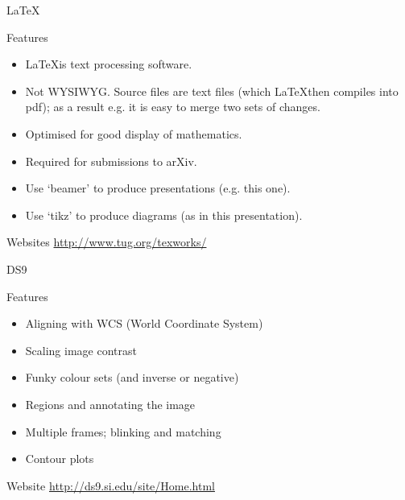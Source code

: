 \documentclass{beamer}
\begin{document}
\begin{frame}{\LaTeX}
  \begin{block}{Features}
    \begin{itemize}
      \item \LaTeX is text processing software.
      \item Not WYSIWYG. Source files are text files (which \LaTeX then compiles into pdf); as a result e.g. it is easy to merge two sets of changes.
      \item Optimised for good display of mathematics.
      \item Required for submissions to arXiv.
      \item Use `beamer' to produce presentations (e.g. this one).
      \item Use `tikz' to produce diagrams (as in this presentation).
    \end{itemize}
  \end{block}
  \begin{block}{Websites}
    \url{http://www.tug.org/texworks/}
  \end{block}
\end{frame}

\begin{frame}{DS9}
  \begin{block}{Features}
   \begin{itemize}
    \item{Aligning with WCS (World Coordinate System)}
    \item{Scaling image contrast}
    \item{Funky colour sets (and inverse or negative)}
    \item{Regions and annotating the image}
    \item{Multiple frames; blinking and matching}    
    \item{Contour plots}
  \end{itemize}
  \end{block}
  \begin{block}{Website}
    \url{http://ds9.si.edu/site/Home.html}
  \end{block}
\end{frame}
\end{document}
